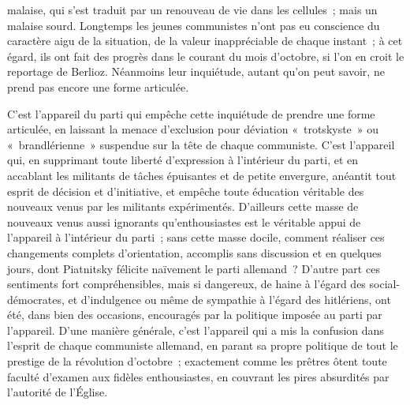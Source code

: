 \documentclass[french,twoside]{book} %
\begin{document}
malaise, qui s'est traduit par un renouveau de vie dans les cellules ; mais un malaise sourd. Longtemps les jeunes communistes n'ont pas eu conscience du caractère aigu de la situation, de la valeur inappréciable de chaque instant ; à cet égard, ils ont fait des progrès dans le courant du mois d'octobre, si l'on en croit le reportage de Berlioz. Néanmoins leur inquiétude, autant qu'on peut savoir, ne prend pas encore une forme articulée.\par
C'est l'appareil du parti qui empêche cette inquiétude de prendre une forme articulée, en laissant la menace d'exclusion pour déviation « trotskyste » ou « brandlérienne » suspendue sur la tête de chaque communiste. C'est l'appareil qui, en supprimant toute liberté d'expression à l'intérieur du parti, et en accablant les militants de tâches épuisantes et de petite envergure, anéantit tout esprit de décision et d'initiative, et empêche toute éducation véritable des nouveaux venus par les militants expérimentés. D'ailleurs cette masse de nouveaux venus aussi ignorants qu'enthousiastes est le véritable appui de l'appareil à l'intérieur du parti ; sans cette masse docile, comment réaliser ces changements complets d'orientation, accomplis sans discussion et en quelques jours, dont Piatnitsky félicite naïvement le parti allemand ? D'autre part ces sentiments fort compréhensibles, mais si dangereux, de haine à l'égard des social-démocrates, et d'indulgence ou même de sympathie à l'égard des hitlé­riens, ont été, dans bien des occasions, encouragés par la politique imposée au parti par l'appareil. D'une manière générale, c'est l'appareil qui a mis la confusion dans l'esprit de chaque communiste allemand, en parant sa propre politique de tout le prestige de la révolution d'octobre ; exactement comme les prêtres ôtent toute faculté d'examen aux fidèles enthousiastes, en couvrant les pires absurdités par l'autorité de l'Église.\par
\end{document}
